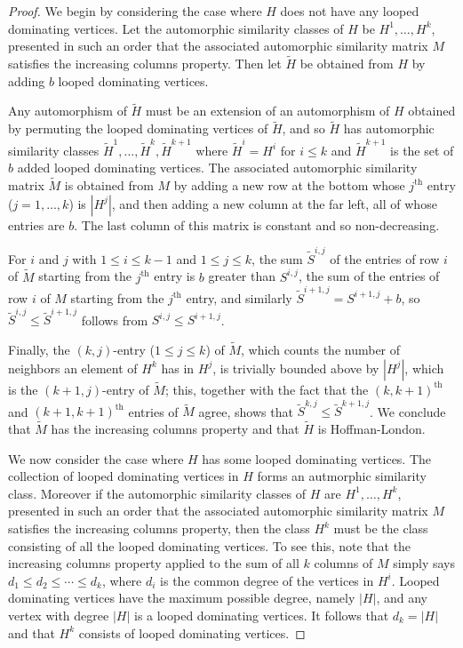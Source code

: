 \documentclass[11pt]{article}
\theoremstyle{definition}
\newcommand{\ith}[1]{$#1^{\text{th}}$}
\begin{document}
\begin{proof}
We begin by considering the case where $H$ does not have any looped dominating vertices. Let the automorphic similarity classes of $H$ be $H^1, \ldots, H^k$, presented in such an order that the associated automorphic similarity matrix $M$ satisfies the increasing columns property. Then let $\widetilde{H}$ be obtained from $H$ by adding $b$ looped dominating vertices.

Any automorphism of $\widetilde{H}$ must be an extension of an automorphism of $H$ obtained by permuting the looped dominating vertices of $\widetilde{H}$, and so $\widetilde{H}$ has automorphic similarity classes $\widetilde{H}^1, \ldots, \widetilde{H}^k, \widetilde{H}^{k+1}$ where $\widetilde{H}^i = H^i$ for $i \le k$ and $\widetilde{H}^{k+1}$ is the set of $b$ added looped dominating vertices. The associated automorphic similarity matrix $\widetilde{M}$ is obtained from $M$ by adding a new row at the bottom whose \ith{j} entry ($j=1, \ldots, k$) is $|H^j|$, and then adding a new column at the far left, all of whose entries are $b$. The last column of this matrix is constant and so non-decreasing. 

For $i$ and $j$ with $1 \le i \le k-1$ and $1 \le j \le k$, the sum $\widetilde{S}^{i,j}$ of the entries of row $i$ of $\widetilde{M}$ starting from the \ith{j} entry is $b$ greater than $S^{i,j}$, the sum of the entries of row $i$ of $M$ starting from the \ith{j} entry, and similarly $\widetilde{S}^{i+1,j} = S^{i+1,j}+b$, so $\widetilde{S}^{i,j} \le \widetilde{S}^{i+1,j}$ follows from $S^{i,j} \le S^{i+1,j}$. 

Finally, the $(k,j)$-entry ($1 \le j \le k$) of $\widetilde{M}$, which counts the number of neighbors an element of $H^k$ has in $H^j$, is trivially bounded above by $|H^j|$, which is the $(k+1,j)$-entry of $\widetilde{M}$; this, together with the fact that the \ith{(k,k+1)} and \ith{(k+1,k+1)} entries of $\widetilde{M}$ agree, shows that $\widetilde{S}^{k,j} \le \widetilde{S}^{k+1,j}$. We conclude that $\widetilde{M}$ has the increasing columns property and that $\widetilde{H}$ is Hoffman-London.

We now consider the case where $H$ has some looped dominating vertices. The collection of looped dominating vertices in $H$ forms an autmorphic similarity class. Moreover if the automorphic similarity classes of $H$ are $H^1, \ldots, H^k$, presented in such an order that the associated automorphic similarity matrix $M$ satisfies the increasing columns property, then the class $H^k$ must be the class consisting of all the looped dominating vertices. To see this, note that the increasing columns property applied to the sum of all $k$ columns of $M$ simply says $d_1 \le d_2 \le \cdots \le d_k$, where $d_i$ is the common degree of the vertices in $H^i$. Looped dominating vertices have the maximum possible degree, namely $|H|$, and any vertex with degree $|H|$ is a looped dominating vertices. It follows that $d_k=|H|$ and that $H^k$ consists of looped dominating vertices.


\end{proof}
\end{document}

